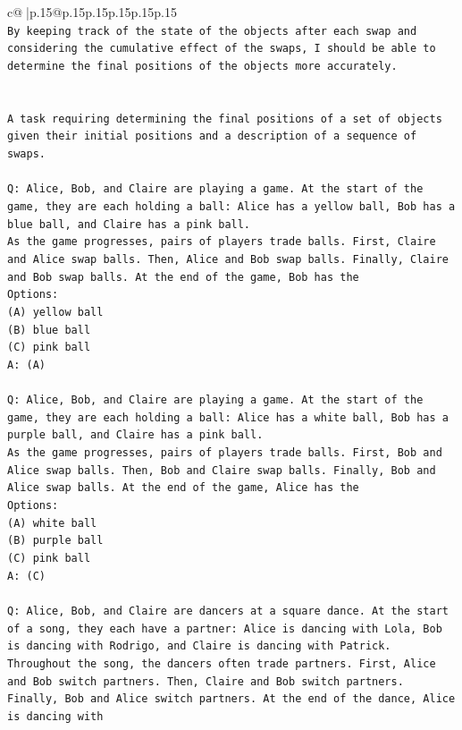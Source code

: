 \documentclass{article}
\begin{document}
{\begin{supertabular}{c@{$\;$}|p{.15\linewidth}@{}p{.15\linewidth}p{.15\linewidth}p{.15\linewidth}p{.15\linewidth}p{.15\linewidth}}
{{{\\ 
\texttt{By keeping track of the state of the objects after each swap and considering the cumulative effect of the swaps, I should be able to determine the final positions of the objects more accurately.} \\
\\ 
\\ 
\texttt{A task requiring determining the final positions of a set of objects given their initial positions and a description of a sequence of swaps.} \\
\\ 
\texttt{Q: Alice, Bob, and Claire are playing a game. At the start of the game, they are each holding a ball: Alice has a yellow ball, Bob has a blue ball, and Claire has a pink ball.} \\
\texttt{As the game progresses, pairs of players trade balls. First, Claire and Alice swap balls. Then, Alice and Bob swap balls. Finally, Claire and Bob swap balls. At the end of the game, Bob has the} \\
\texttt{Options:} \\
\texttt{(A) yellow ball} \\
\texttt{(B) blue ball} \\
\texttt{(C) pink ball} \\
\texttt{A: (A)} \\
\\ 
\texttt{Q: Alice, Bob, and Claire are playing a game. At the start of the game, they are each holding a ball: Alice has a white ball, Bob has a purple ball, and Claire has a pink ball.} \\
\texttt{As the game progresses, pairs of players trade balls. First, Bob and Alice swap balls. Then, Bob and Claire swap balls. Finally, Bob and Alice swap balls. At the end of the game, Alice has the} \\
\texttt{Options:} \\
\texttt{(A) white ball} \\
\texttt{(B) purple ball} \\
\texttt{(C) pink ball} \\
\texttt{A: (C)} \\
\\ 
\texttt{Q: Alice, Bob, and Claire are dancers at a square dance. At the start of a song, they each have a partner: Alice is dancing with Lola, Bob is dancing with Rodrigo, and Claire is dancing with Patrick.} \\
\texttt{Throughout the song, the dancers often trade partners. First, Alice and Bob switch partners. Then, Claire and Bob switch partners. Finally, Bob and Alice switch partners. At the end of the dance, Alice is dancing with} \\
}}}
\end{supertabular}}
\end{document}

